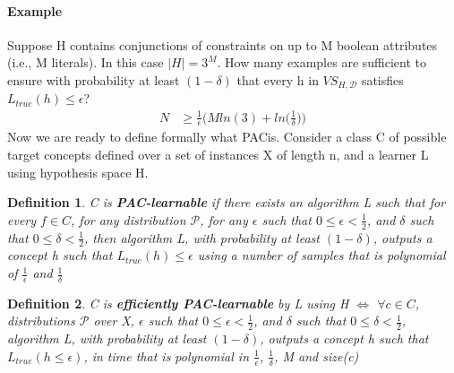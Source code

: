 \documentclass[main.tex]{subfiles}
\newtheorem{definition}{Definition}[section]
\begin{document}
\paragraph{Example} Suppose H contains conjunctions of constraints on up to M boolean attributes (i.e., M literals). In this case $|H|=3^M$. How many examples are sufficient to ensure with probability at least $(1-\delta)$ that every h in $VS_{H,\mathcal{D}}$ satisfies $L_{true}(h) \leq \epsilon$?
\begin{align*}
    N &\geq \frac{1}{\epsilon} \bigg( Mln(3) + ln \bigg( \frac{1}{\delta} \bigg) \bigg)
\end{align*}
\newline
Now we are ready to define formally what PAC\footnotemark is. Consider a class C of possible target concepts defined over a set of instances X of length n, and a learner L using hypothesis space H. 
\begin{definition}
C is \textbf{PAC-learnable} if there exists an algorithm L such that for every $f \in C$, for any distribution $\mathcal{P}$, for any $\epsilon$ such that $0 \leq \epsilon < \frac{1}{2}$, and $\delta$ such that $0 \leq \delta < \frac{1}{2}$, then algorithm L, with probability at least $(1-\delta)$, outputs a concept h such that $L_{true}(h) \leq \epsilon$ using a number of samples that is polynomial of $\frac{1}{\epsilon}$ and $\frac{1}{\delta}$
\end{definition}
\begin{definition}
C is \textbf{efficiently PAC-learnable} by L using H $\iff$ $\forall c \in C$, distributions $\mathcal{P}$ over X, $\epsilon$ such that $0 \leq \epsilon < \frac{1}{2}$, and $\delta$ such that $0 \leq \delta < \frac{1}{2}$, algorithm L, with probability at least $(1-\delta)$, outputs a concept h such that $L_{true}(h \leq \epsilon)$, in time that is polynomial in $\frac{1}{\epsilon}$, $\frac{1}{\delta}$, M and size(c)\footnotemark
\end{definition} 
\end{document}

